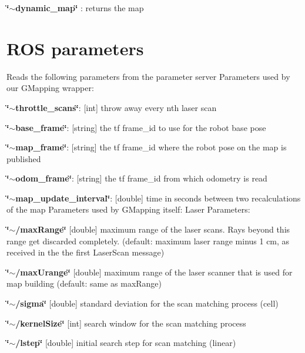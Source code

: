 \begin{DoxyItemize}
\item {\bfseries \char`\"{}$\sim$dynamic\+\_\+map\char`\"{}} \+: returns the map 
\end{DoxyItemize}\hypertarget{index_parameters}{}\section{R\+O\+S parameters}\label{index_parameters}
Reads the following parameters from the parameter server Parameters used by our G\+Mapping wrapper\+:
\begin{DoxyItemize}
\item {\bfseries \char`\"{}$\sim$throttle\+\_\+scans\char`\"{}}\+: {\bfseries }\mbox{[}int\mbox{]} throw away every nth laser scan
\item {\bfseries \char`\"{}$\sim$base\+\_\+frame\char`\"{}}\+: {\bfseries }\mbox{[}string\mbox{]} the tf frame\+\_\+id to use for the robot base pose
\item {\bfseries \char`\"{}$\sim$map\+\_\+frame\char`\"{}}\+: {\bfseries }\mbox{[}string\mbox{]} the tf frame\+\_\+id where the robot pose on the map is published
\item {\bfseries \char`\"{}$\sim$odom\+\_\+frame\char`\"{}}\+: {\bfseries }\mbox{[}string\mbox{]} the tf frame\+\_\+id from which odometry is read
\item {\bfseries \char`\"{}$\sim$map\+\_\+update\+\_\+interval\char`\"{}}\+: {\bfseries }\mbox{[}double\mbox{]} time in seconds between two recalculations of the map Parameters used by G\+Mapping itself\+: Laser Parameters\+:
\item {\bfseries \char`\"{}$\sim$/max\+Range\char`\"{}} {\bfseries }\mbox{[}double\mbox{]} maximum range of the laser scans. Rays beyond this range get discarded completely. (default\+: maximum laser range minus 1 cm, as received in the the first Laser\+Scan message)
\item {\bfseries \char`\"{}$\sim$/max\+Urange\char`\"{}} {\bfseries }\mbox{[}double\mbox{]} maximum range of the laser scanner that is used for map building (default\+: same as max\+Range)
\item {\bfseries \char`\"{}$\sim$/sigma\char`\"{}} {\bfseries }\mbox{[}double\mbox{]} standard deviation for the scan matching process (cell)
\item {\bfseries \char`\"{}$\sim$/kernel\+Size\char`\"{}} {\bfseries }\mbox{[}int\mbox{]} search window for the scan matching process
\item {\bfseries \char`\"{}$\sim$/lstep\char`\"{}} {\bfseries }\mbox{[}double\mbox{]} initial search step for scan matching (linear)

\end{DoxyItemize}

